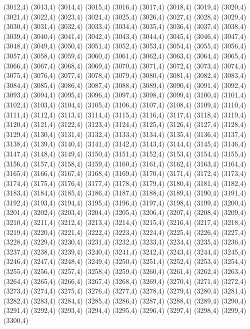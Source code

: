 (3012,4)
(3013,4)
(3014,4)
(3015,4)
(3016,4)
(3017,4)
(3018,4)
(3019,4)
(3020,4)
(3021,4)
(3022,4)
(3023,4)
(3024,4)
(3025,4)
(3026,4)
(3027,4)
(3028,4)
(3029,4)
(3030,4)
(3031,4)
(3032,4)
(3033,4)
(3034,4)
(3035,4)
(3036,4)
(3037,4)
(3038,4)
(3039,4)
(3040,4)
(3041,4)
(3042,4)
(3043,4)
(3044,4)
(3045,4)
(3046,4)
(3047,4)
(3048,4)
(3049,4)
(3050,4)
(3051,4)
(3052,4)
(3053,4)
(3054,4)
(3055,4)
(3056,4)
(3057,4)
(3058,4)
(3059,4)
(3060,4)
(3061,4)
(3062,4)
(3063,4)
(3064,4)
(3065,4)
(3066,4)
(3067,4)
(3068,4)
(3069,4)
(3070,4)
(3071,4)
(3072,4)
(3073,4)
(3074,4)
(3075,4)
(3076,4)
(3077,4)
(3078,4)
(3079,4)
(3080,4)
(3081,4)
(3082,4)
(3083,4)
(3084,4)
(3085,4)
(3086,4)
(3087,4)
(3088,4)
(3089,4)
(3090,4)
(3091,4)
(3092,4)
(3093,4)
(3094,4)
(3095,4)
(3096,4)
(3097,4)
(3098,4)
(3099,4)
(3100,4)
(3101,4)
(3102,4)
(3103,4)
(3104,4)
(3105,4)
(3106,4)
(3107,4)
(3108,4)
(3109,4)
(3110,4)
(3111,4)
(3112,4)
(3113,4)
(3114,4)
(3115,4)
(3116,4)
(3117,4)
(3118,4)
(3119,4)
(3120,4)
(3121,4)
(3122,4)
(3123,4)
(3124,4)
(3125,4)
(3126,4)
(3127,4)
(3128,4)
(3129,4)
(3130,4)
(3131,4)
(3132,4)
(3133,4)
(3134,4)
(3135,4)
(3136,4)
(3137,4)
(3138,4)
(3139,4)
(3140,4)
(3141,4)
(3142,4)
(3143,4)
(3144,4)
(3145,4)
(3146,4)
(3147,4)
(3148,4)
(3149,4)
(3150,4)
(3151,4)
(3152,4)
(3153,4)
(3154,4)
(3155,4)
(3156,4)
(3157,4)
(3158,4)
(3159,4)
(3160,4)
(3161,4)
(3162,4)
(3163,4)
(3164,4)
(3165,4)
(3166,4)
(3167,4)
(3168,4)
(3169,4)
(3170,4)
(3171,4)
(3172,4)
(3173,4)
(3174,4)
(3175,4)
(3176,4)
(3177,4)
(3178,4)
(3179,4)
(3180,4)
(3181,4)
(3182,4)
(3183,4)
(3184,4)
(3185,4)
(3186,4)
(3187,4)
(3188,4)
(3189,4)
(3190,4)
(3191,4)
(3192,4)
(3193,4)
(3194,4)
(3195,4)
(3196,4)
(3197,4)
(3198,4)
(3199,4)
(3200,4)
(3201,4)
(3202,4)
(3203,4)
(3204,4)
(3205,4)
(3206,4)
(3207,4)
(3208,4)
(3209,4)
(3210,4)
(3211,4)
(3212,4)
(3213,4)
(3214,4)
(3215,4)
(3216,4)
(3217,4)
(3218,4)
(3219,4)
(3220,4)
(3221,4)
(3222,4)
(3223,4)
(3224,4)
(3225,4)
(3226,4)
(3227,4)
(3228,4)
(3229,4)
(3230,4)
(3231,4)
(3232,4)
(3233,4)
(3234,4)
(3235,4)
(3236,4)
(3237,4)
(3238,4)
(3239,4)
(3240,4)
(3241,4)
(3242,4)
(3243,4)
(3244,4)
(3245,4)
(3246,4)
(3247,4)
(3248,4)
(3249,4)
(3250,4)
(3251,4)
(3252,4)
(3253,4)
(3254,4)
(3255,4)
(3256,4)
(3257,4)
(3258,4)
(3259,4)
(3260,4)
(3261,4)
(3262,4)
(3263,4)
(3264,4)
(3265,4)
(3266,4)
(3267,4)
(3268,4)
(3269,4)
(3270,4)
(3271,4)
(3272,4)
(3273,4)
(3274,4)
(3275,4)
(3276,4)
(3277,4)
(3278,4)
(3279,4)
(3280,4)
(3281,4)
(3282,4)
(3283,4)
(3284,4)
(3285,4)
(3286,4)
(3287,4)
(3288,4)
(3289,4)
(3290,4)
(3291,4)
(3292,4)
(3293,4)
(3294,4)
(3295,4)
(3296,4)
(3297,4)
(3298,4)
(3299,4)
(3300,4)
